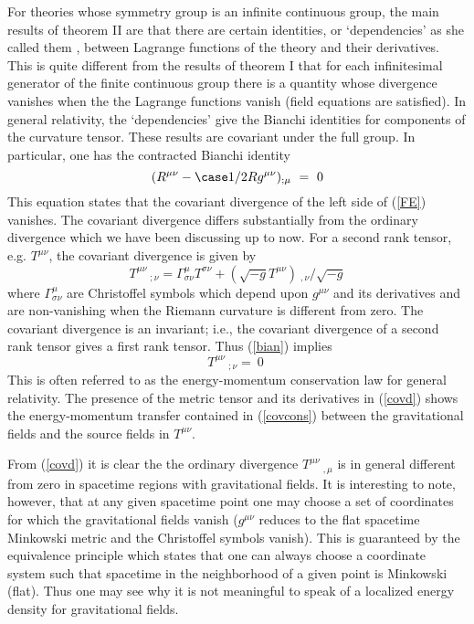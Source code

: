 For theories whose symmetry group is an infinite continuous group, the main
results of theorem II are that there are certain identities, or `dependencies' as she called them
\cite{noet}, between 
Lagrange functions of the
theory and their derivatives.  This is quite different from the results of
theorem I that for each infinitesimal generator of the finite
continuous group there is a quantity whose divergence vanishes when the
 the Lagrange functions vanish (field equations are satisfied).
In general relativity, the `dependencies'  give the Bianchi
identities for components of the curvature tensor. These results
are covariant under the full group.
In particular, one has 
the contracted Bianchi identity
\begin{equation}
(R^{\mu\nu}  - \case 1/2Rg^{\mu\nu})_{;\mu} ~=~0    \label{bian}
\end{equation}
This equation states that the covariant divergence of the left side of (\ref{FE}) vanishes.
The covariant divergence differs substantially from the ordinary divergence
which we have been discussing up to now.  For a second rank tensor, e.g. 
$T^{\mu\nu}$,
the covariant divergence
  is given by
 \begin{equation}
T^{\mu\nu} ~  _{ ;\nu} = \Gamma^\mu_{\sigma\nu} T^{\sigma\nu} +(\sqrt{-g}
T^{\mu\nu}) ~ _{,\nu}/\sqrt{-g} \label{covd}
\end{equation}
 where $\Gamma^\mu_{\sigma\nu}$ are Christoffel symbols which depend upon
 $g^{\mu\nu}$ and its derivatives and are
non-vanishing when the Riemann curvature is different from zero.
The covariant divergence is an invariant; i.e., the covariant divergence
of a second rank tensor gives a first rank tensor. Thus (\ref{bian})
 implies
\begin{equation}
T^{\mu\nu} ~  _{ ;\nu} = ~0 \; \label{covcons}
\end{equation}
This is often referred to as the  energy-momentum conservation law
for general relativity. The presence of the metric tensor and its
derivatives in (\ref{covd}) shows the energy-momentum transfer 
contained in (\ref{covcons}) between the gravitational
fields and the source fields in $T^{\mu\nu}$.

From
(\ref{covd}) it is clear the the ordinary divergence $T^{\mu\nu}~_{,\mu}$
is in general different from zero in spacetime regions with gravitational
 fields. It is interesting to note, however, that 
at any given spacetime point one may choose a set of coordinates for which
the gravitational fields vanish  ($g^{\mu\nu}$ reduces to the flat spacetime
Minkowski metric and the Christoffel symbols vanish). This is
guaranteed by the equivalence
principle which states that one can always choose a coordinate system such 
that spacetime in the neighborhood of a given
point is Minkowski (flat). Thus one may see why it is not meaningful to speak
of a localized energy density for gravitational fields.

